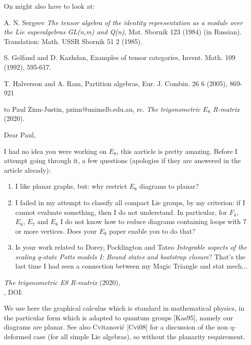 \begin{description}
On might also have to look at:

A. N. Sergeev {\em The tensor algebra of the identity representation as a
module over the Lie superalgebras GL(n,m) and Q(n)}, Mat. Sbornik
123 (1984) (in Russian). Translation: Math. USSR Sbornik 51 2
(1985).

S. Gelfand and D. Kazhdan, Examples of tensor categories, Invent.
Math. 109 (1992), 595-617.

T. Halverson and A. Ram, Partition algebras, Eur. J. Combin. 26 6
(2005), 869-921

\item[2024-10-01 Predrag] to 
{Paul Zinn-Justin}, pzinn@unimelb.edu.au,
re. {\em The trigonometric {$E_8$} {R}-matrix} (2020).

Dear Paul,

I had no idea you were working on $E_8$, this aarticle is pretty amazing.
Before I attempt going through it, a few questions (apologies if they are answered in 
the article already):

\begin{enumerate}
  \item 
I like planar graphs, but: why restrict  $E_8$ diagrams to planar?
  \item
I failed in my attempt to classify all compact Lie groups, by my 
criterion: if I cannot evaluate something, then I do not understand. In 
particular, for $F_4$, $E_6$,  $E_7$ and $E_8$ I do not know how to 
reduce diagrams containing loops with 7 or more vertices. Does your $E_8$ 
paper enable you to do that? 
  \item Is your work related to
 Dorey, Pocklington and Tateo 
{\em Integrable aspects of the scaling q-state Potts models I:
    Bound states and bootstrap closure}? That's the last time I had 
seen a connection between my Magic Triangle and stat mech...
\end{enumerate}

\item[2020-04-04 Paul Zinn-Justin]
{\em The trigonometric E8 R-matrix} (2020), 
\\
,
 {DOI}:

We use here the graphical calculus which is standard in mathematical
physics, in the particular form which is adapted to quantum groups
[Kas95], namely our diagrams are planar. See also Cvitanovi{\'c} [Cvi08] for
a discussion of the non q-deformed case (for all simple Lie algebras), so
without the planarity requirement.


\end{description}
